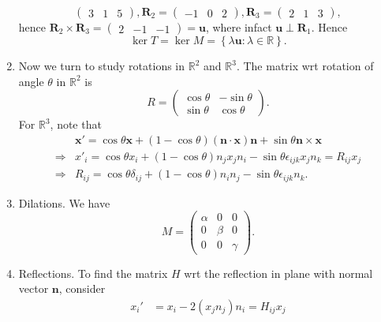 \documentclass[a4paper]{article}
\begin{document}
\begin{example}
\begin{enumerate}[(1)]
\[\begin{pmatrix}
          3&1&5
        \end{pmatrix},\mathbf{R}_2=
        \begin{pmatrix}
          -1&0&2
        \end{pmatrix},\mathbf{R}_3=
        \begin{pmatrix}
          2&1&3
        \end{pmatrix}
      ,\]
      hence $ \mathbf{R}_2 \times \mathbf{R}_3 =
      \begin{pmatrix}
        2&-1&-1
      \end{pmatrix}=\mathbf{u} $, where infact $ \mathbf{u} \perp
      \mathbf{R}_1 $. Hence
      \[
        \ker T=\ker M=\left\{ \lambda \mathbf{u}:\lambda\in \mathbb{R}\right\}
      .\]
    \item Now we turn to study rotations in $ \mathbb{R}^{2} $ and $
      \mathbb{R}^{3} $. The matrix wrt rotation of angle $ \theta $
      in $ \mathbb{R}^{2} $ is
      \[
        R=
        \begin{pmatrix}
          \cos \theta&-\sin \theta\\
          \sin \theta&\cos \theta
        \end{pmatrix}
      .\]
      For $ \mathbb{R}^{3} $, note that
      \[
        \begin{aligned}
          &\mathbf{x}'=\cos \theta \mathbf{x}+(1-\cos
          \theta)(\mathbf{n}\cdot \mathbf{x})\mathbf{n}+\sin \theta
          \mathbf{n}\times \mathbf{x}\\
          \Longrightarrow &x'_i= \cos \theta x_i+(1-\cos
          \theta)n_jx_jn_i-\sin \theta \epsilon_{ijk}x_j n_k=R_{ij}x_j\\
          \Longrightarrow & R_{ij}=\cos \theta \delta_{ij}+(1-\cos
          \theta)n_in_j-\sin \theta \epsilon_{ijk} n_k.
        \end{aligned}
      \]
    \item Dilations. We have
      \[
        M=
        \begin{pmatrix}
          \alpha&0&0\\
          0&\beta&0\\
          0&0&\gamma
        \end{pmatrix}
      .\]
    \item Reflections. To find the matrix $H$ wrt the reflection in
      plane with normal vector $ \mathbf{n} $, consider
      \[
        \begin{aligned}
          x_i'&=x_i-2(x_jn_j)n_i=H_{ij}x_j\\

\end{aligned}\]
\end{enumerate}
\end{example}
\end{document}
